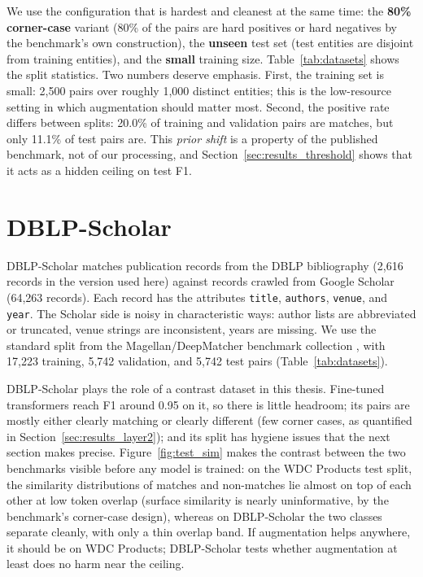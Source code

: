 \documentclass[a4paper,oneside,bibliography=totoc]{scrbook}
\begin{document}
We use the configuration that is hardest and cleanest at the same time: the \textbf{80\% corner-case} variant (80\% of the pairs are hard positives or hard negatives by the benchmark's own construction), the \textbf{unseen} test set (test entities are disjoint from training entities), and the \textbf{small} training size. Table~\ref{tab:datasets} shows the split statistics. Two numbers deserve emphasis. First, the training set is small: 2{,}500 pairs over roughly 1{,}000 distinct entities; this is the low-resource setting in which augmentation should matter most. Second, the positive rate differs between splits: 20.0\% of training and validation pairs are matches, but only 11.1\% of test pairs are. This \emph{prior shift} is a property of the published benchmark, not of our processing, and Section~\ref{sec:results_threshold} shows that it acts as a hidden ceiling on test F1.

\section{DBLP-Scholar}
\label{sec:data_dblp}

DBLP-Scholar \cite{kopcke2010evaluation} matches publication records from the DBLP bibliography (2{,}616 records in the version used here) against records crawled from Google Scholar (64{,}263 records). Each record has the attributes \texttt{title}, \texttt{authors}, \texttt{venue}, and \texttt{year}. The Scholar side is noisy in characteristic ways: author lists are abbreviated or truncated, venue strings are inconsistent, years are missing. We use the standard split from the Magellan/DeepMatcher benchmark collection \cite{mudgal2018deep}, with 17{,}223 training, 5{,}742 validation, and 5{,}742 test pairs (Table~\ref{tab:datasets}).

DBLP-Scholar plays the role of a contrast dataset in this thesis. Fine-tuned transformers reach F1 around 0.95 on it, so there is little headroom; its pairs are mostly either clearly matching or clearly different (few corner cases, as quantified in Section~\ref{sec:results_layer2}); and its split has hygiene issues that the next section makes precise. Figure~\ref{fig:test_sim} makes the contrast between the two benchmarks visible before any model is trained: on the WDC Products test split, the similarity distributions of matches and non-matches lie almost on top of each other at low token overlap (surface similarity is nearly uninformative, by the benchmark's corner-case design), whereas on DBLP-Scholar the two classes separate cleanly, with only a thin overlap band. If augmentation helps anywhere, it should be on WDC Products; DBLP-Scholar tests whether augmentation at least does no harm near the ceiling.
\end{document}
